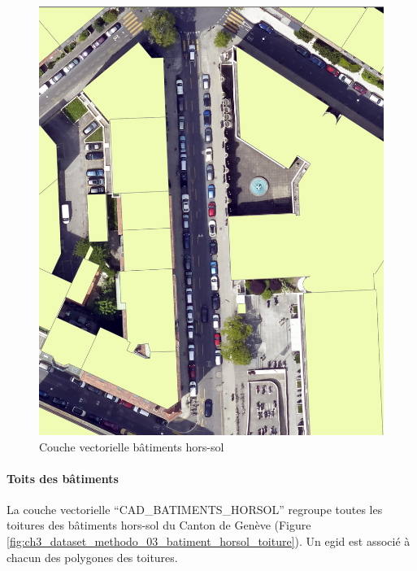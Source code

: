 \begin{figure}[H]
    \centering
    \includegraphics[width=1\linewidth]{02-main//figures/ch3_dataset_methodo_02_batiment_horsol.png}
    \caption{Couche vectorielle bâtiments hors-sol}
    \label{fig:ch3_dataset_methodo_02_batiment_horsol}
\end{figure}


\newpage
\paragraph{Toits des bâtiments}
La couche vectorielle ``CAD\_BATIMENTS\_HORSOL'' \cite{sitg_toits_nodate} regroupe toutes les toitures des bâtiments hors-sol du Canton de Genève (Figure \ref{fig:ch3_dataset_methodo_03_batiment_horsol_toiture}). Un \gls{egid} est associé à chacun des polygones des toitures.

